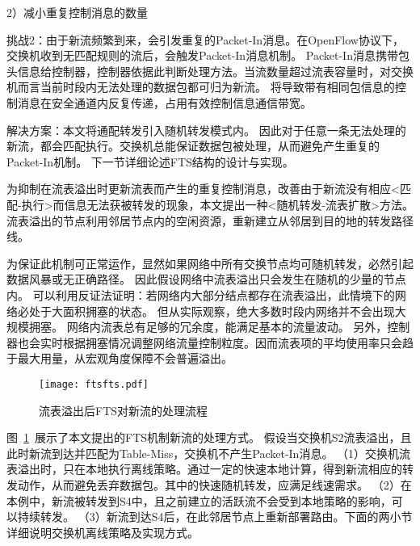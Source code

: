 2）减小重复控制消息的数量

挑战2：由于新流频繁到来，会引发重复的Packet-In消息。在OpenFlow协议下，交换机收到无匹配规则的流后，会触发Packet-In消息机制。
Packet-In消息携带包头信息给控制器，控制器依据此判断处理方法。当流数量超过流表容量时，对交换机而言当前时段内无法处理的数据包都可归为新流。
将导致带有相同包信息的控制消息在安全通道内反复传递，占用有效控制信息通信带宽。

解决方案：本文将通配转发引入随机转发模式内。
因此对于任意一条无法处理的新流，都会匹配执行。交换机总能保证数据包被处理，从而避免产生重复的Packet-In机制。
下一节详细论述FTS结构的设计与实现。



\label{chap55}

为抑制在流表溢出时更新流表而产生的重复控制消息，改善由于新流没有相应<匹配-执行>而信息无法获被转发的现象，本文提出一种<随机转发-流表扩散>方法。
流表溢出的节点利用邻居节点内的空闲资源，重新建立从邻居到目的地的转发路径线。

为保证此机制可正常运作，显然如果网络中所有交换节点均可随机转发，必然引起数据风暴或无正确路径。
因此假设网络中流表溢出只会发生在随机的少量的节点内。
可以利用反证法证明：若网络内大部分结点都存在流表溢出，此情境下的网络必处于大面积拥塞的状态。
但从实际观察，绝大多数时段内网络并不会出现大规模拥塞。
网络内流表总有足够的冗余度，能满足基本的流量波动。
另外，控制器也会实时根据拥塞情况调整网络流量控制粒度。因而流表项的平均使用率只会趋于最大用量，从宏观角度保障不会普遍溢出。



\begin{figure}[!ht]
	\centering 
	\vspace{-1.5mm} 
	\texttt{[image: ftsfts.pdf]}
	\caption{流表溢出后FTS对新流的处理流程} \label{fig:ftsfts}
\end{figure}

图~\ref{fig:ftsfts}~展示了本文提出的FTS机制新流的处理方式。
假设当交换机S2流表溢出，且此时新流到达并匹配为Table-Miss，交换机不产生Packet-In消息。
（1）交换机流表溢出时，只在本地执行离线策略。通过一定的快速本地计算，得到新流相应的转发动作，从而避免丢弃数据包。其中的快速随机转发，应满足线速需求。
（2）在本例中，新流被转发到S4中，且之前建立的活跃流不会受到本地策略的影响，可以持续转发。
（3）新流到达S4后，在此邻居节点上重新部署路由。下面的两小节详细说明交换机离线策略及实现方式。

